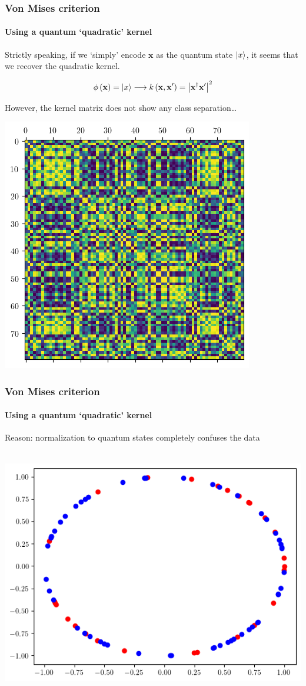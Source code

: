 \documentclass{beamer}
\begin{document}
    \begin{frame}
        \frametitle{Von Mises criterion}
        \framesubtitle{Using a quantum `quadratic' kernel}
        
        Strictly speaking, if we `simply' encode $\mathbf{x}$ as the quantum state $\ket{x}$, it seems that we recover the quadratic kernel.
        
        \centering
        \[
            \phi\left( \mathbf{x} \right) = \ket{x} \longrightarrow k\left( \mathbf{x}, \mathbf{x}^\prime \right) = \abs{\mathbf{x}^\dagger \mathbf{x}^\prime}^2
        \]

        \pause
        \begin{minipage}{.3\textwidth}
            However, the kernel matrix does not show any class separation\dots
        \end{minipage}
        \begin{minipage}{.6\textwidth}
            \centering
            \includegraphics[width=.6\textwidth]{pics/amp-enc-kernel-matrix.png}
        \end{minipage}  
        
    \end{frame}

    \begin{frame}
        \frametitle{Von Mises criterion}
        \framesubtitle{Using a quantum `quadratic' kernel}
    
        Reason: normalization to quantum states completely confuses the data

        \ \\
        \pause
        \centering
        \includegraphics[width=.6\textwidth]{pics/vm-data-2d-normalized.png}
    
    \end{frame}
    
\end{document}
